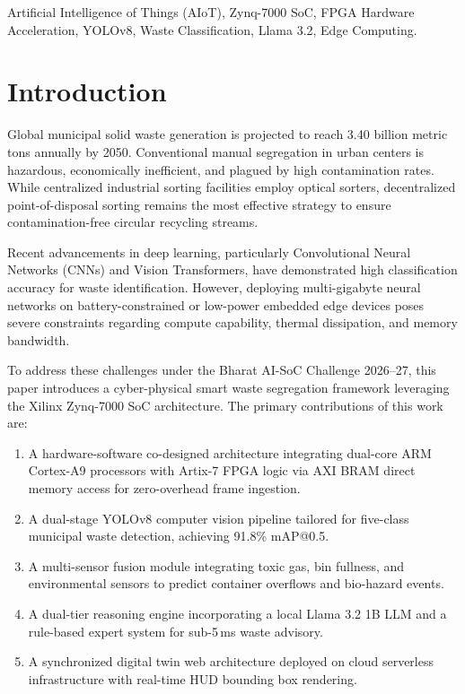 \documentclass[conference]{IEEEtran}
\begin{document}
\begin{IEEEkeywords}
Artificial Intelligence of Things (AIoT), Zynq-7000 SoC, FPGA Hardware Acceleration, YOLOv8, Waste Classification, Llama 3.2, Edge Computing.
\end{IEEEkeywords}

\section{Introduction}
Global municipal solid waste generation is projected to reach 3.40 billion metric tons annually by 2050. Conventional manual segregation in urban centers is hazardous, economically inefficient, and plagued by high contamination rates. While centralized industrial sorting facilities employ optical sorters, decentralized point-of-disposal sorting remains the most effective strategy to ensure contamination-free circular recycling streams.

Recent advancements in deep learning, particularly Convolutional Neural Networks (CNNs) and Vision Transformers, have demonstrated high classification accuracy for waste identification. However, deploying multi-gigabyte neural networks on battery-constrained or low-power embedded edge devices poses severe constraints regarding compute capability, thermal dissipation, and memory bandwidth.

To address these challenges under the Bharat AI-SoC Challenge 2026--27, this paper introduces a cyber-physical smart waste segregation framework leveraging the Xilinx Zynq-7000 SoC architecture. The primary contributions of this work are:
\begin{enumerate}
    \item A hardware-software co-designed architecture integrating dual-core ARM Cortex-A9 processors with Artix-7 FPGA logic via AXI BRAM direct memory access for zero-overhead frame ingestion.
    \item A dual-stage YOLOv8 computer vision pipeline tailored for five-class municipal waste detection, achieving 91.8\% mAP@0.5.
    \item A multi-sensor fusion module integrating toxic gas, bin fullness, and environmental sensors to predict container overflows and bio-hazard events.
    \item A dual-tier reasoning engine incorporating a local Llama 3.2 1B LLM and a rule-based expert system for sub-5\,ms waste advisory.
    \item A synchronized digital twin web architecture deployed on cloud serverless infrastructure with real-time HUD bounding box rendering.
\end{enumerate}
\end{document}
